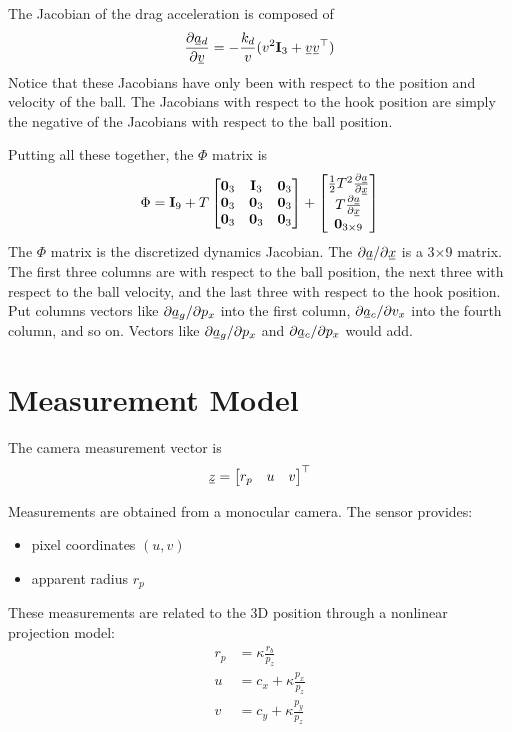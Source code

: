 \documentclass[11pt, letterpaper, twocolumn]{article}
\newcommand{\ul}[1] %
    {{}\mkern1mu\underline{\mkern-1mu#1\mkern-1mu}\mkern1mu}
\begin{document}
The Jacobian of the drag acceleration is composed of
\[
\frac{\partial\ul{a}_d}{\partial\ul{v}} = -\frac{k_d}{v}(v^2\mathbf{I}_3+\ul{v}\ul{v}^{\top})
\]
Notice that these Jacobians have only been with respect to the position
and velocity of the ball. The Jacobians with respect to the hook position
are simply the negative of the Jacobians with respect to the ball position.

Putting all these together, the $\Phi$ matrix is
\[
\Phi = \mathbf{I}_9+T\begin{bmatrix}
    \mathbf{0}_3 & \mathbf{I}_3 & \mathbf{0}_3 \\
    \mathbf{0}_3 & \mathbf{0}_3 & \mathbf{0}_3 \\
    \mathbf{0}_3 & \mathbf{0}_3 & \mathbf{0}_3
    \end{bmatrix}+\begin{bmatrix}
        \frac{1}{2}T^2\frac{\partial\ul{a}}{\partial\ul{x}} \\
        T\frac{\partial\ul{a}}{\partial\ul{x}} \\
        \mathbf{0}_{3\times9}
    \end{bmatrix}
\]
The $\Phi$ matrix is the discretized dynamics Jacobian. The ${\partial\ul{a}/}{\partial\ul{x}}$
is a 3$\times$9 matrix. The first three columns are with respect to the ball position,
the next three with respect to the ball velocity, and the last three with respect
to the hook position. Put columns vectors like ${\partial\ul{a}_g}/{\partial p_x}$
into the first column, ${\partial\ul{a}_c}/{\partial v_x}$ into the fourth column,
and so on. Vectors like ${\partial\ul{a}_g}/{\partial p_x}$ and
${\partial\ul{a}_c}/{\partial p_x}$ would add.

\section*{Measurement Model}
The camera measurement vector is
\[
\ul{z} = \begin{bmatrix}
        r_p & u & v
    \end{bmatrix}^{\top}
\]

Measurements are obtained from a monocular camera. The sensor provides:
\begin{itemize}
    \item pixel coordinates $(u, v)$
    \item apparent radius $r_p$
\end{itemize}

These measurements are related to the 3D position through a nonlinear projection model:
\[ \begin{aligned}
r_p &= \kappa \frac{r_b}{p_z} \\
u &= c_x + \kappa \frac{p_x}{p_z} \\
v &= c_y + \kappa \frac{p_y}{p_z}
\end{aligned}
\]
\end{document}
